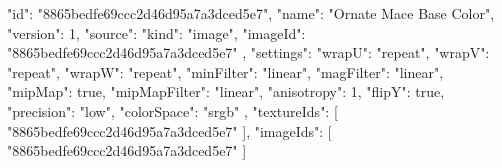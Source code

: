 {
  "id": "8865bedfe69ccc2d46d95a7a3dced5e7",
  "name": "Ornate Mace Base Color",
  "version": 1,
  "source": {
    "kind": "image",
    "imageId": "8865bedfe69ccc2d46d95a7a3dced5e7"
  },
  "settings": {
    "wrapU": "repeat",
    "wrapV": "repeat",
    "wrapW": "repeat",
    "minFilter": "linear",
    "magFilter": "linear",
    "mipMap": true,
    "mipMapFilter": "linear",
    "anisotropy": 1,
    "flipY": true,
    "precision": "low",
    "colorSpace": "srgb"
  },
  "textureIds": [
    "8865bedfe69ccc2d46d95a7a3dced5e7"
  ],
  "imageIds": [
    "8865bedfe69ccc2d46d95a7a3dced5e7"
  ]
}
